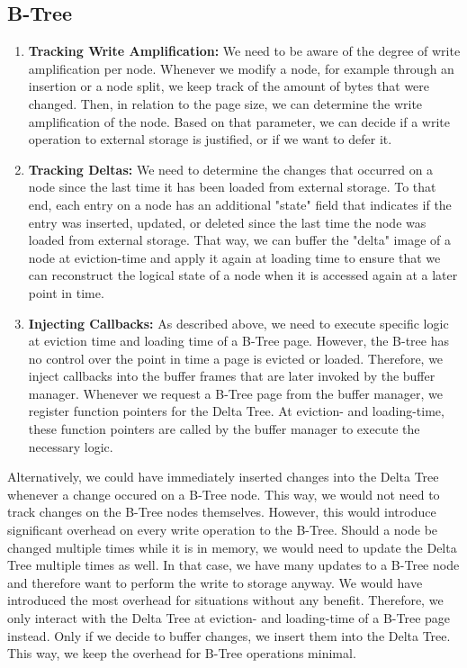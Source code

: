 \subsection*{B-Tree}
\begin{enumerate}
  \item \textbf{Tracking Write Amplification:}
We need to be aware of the degree of write amplification per node. 
Whenever we modify a node, for example through an insertion or a node split, we keep track of the amount of bytes that were changed.
Then, in relation to the page size, we can determine the write amplification of the node.
Based on that parameter, we can decide if a write operation to external storage is justified, or if we want to defer it.
  \item \textbf{Tracking Deltas:} 
We need to determine the changes that occurred on a node since the last time it has been loaded from external storage.
To that end, each entry on a node has an additional "state" field that indicates if the entry was inserted, updated, or deleted since the last time the node was loaded from external storage.
That way, we can buffer the "delta" image of a node at eviction-time and apply it again at loading time to ensure that we can reconstruct the logical state of a node when it is accessed again at a later point in time.
\item \textbf{Injecting Callbacks:}
As described above, we need to execute specific logic at eviction time and loading time of a B-Tree page.
However, the B-tree has no control over the point in time a page is evicted or loaded.
Therefore, we inject callbacks into the buffer frames that are later invoked by the buffer manager.
Whenever we request a B-Tree page from the buffer manager, we register function pointers for the Delta Tree.
At eviction- and loading-time, these function pointers are called by the buffer manager to execute the necessary logic.
\end{enumerate}

Alternatively, we could have immediately inserted changes into the Delta Tree whenever a change occured on a B-Tree node.
This way, we would not need to track changes on the B-Tree nodes themselves.
However, this would introduce significant overhead on every write operation to the B-Tree.
Should a node be changed multiple times while it is in memory, we would need to update the Delta Tree multiple times as well.
In that case, we have many updates to a B-Tree node and therefore want to perform the write to storage anyway.
We would have introduced the most overhead for situations without any benefit.
Therefore, we only interact with the Delta Tree at eviction- and loading-time of a B-Tree page instead.
Only if we decide to buffer changes, we insert them into the Delta Tree.
This way, we keep the overhead for B-Tree operations minimal.

